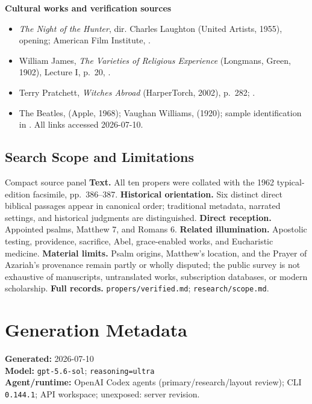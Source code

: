\begin{deepstudy}
\textbf{Cultural works and verification sources}
{\footnotesize
\begin{itemize}[itemsep=0em,topsep=0.15em,parsep=0pt]
\item \emph{The Night of the Hunter}, dir. Charles Laughton (United Artists, 1955), opening; American Film Institute, .
\item William James, \emph{The Varieties of Religious Experience} (Longmans, Green, 1902), Lecture I, p.~20, .
\item Terry Pratchett, \emph{Witches Abroad} (HarperTorch, 2002), p.~282; .
\item The Beatles,  (Apple, 1968); Vaughan Williams,  (1920); sample identification in . All links accessed 2026-07-10.
\end{itemize}
}

\subsection*{Search Scope and Limitations}

\begin{studybox}{Compact source panel}
\textbf{Text.} All ten propers were collated with the 1962 typical-edition facsimile, pp.~386--387. \textbf{Historical orientation.} Six distinct direct biblical passages appear in canonical order; traditional metadata, narrated settings, and historical judgments are distinguished. \textbf{Direct reception.} Appointed psalms, Matthew 7, and Romans 6. \textbf{Related illumination.} Apostolic testing, providence, sacrifice, Abel, grace-enabled works, and Eucharistic medicine. \textbf{Material limits.} Psalm origins, Matthew's location, and the Prayer of Azariah's provenance remain partly or wholly disputed; the public survey is not exhaustive of manuscripts, untranslated works, subscription databases, or modern scholarship. \textbf{Full records.} \nolinkurl{propers/verified.md}; \nolinkurl{research/scope.md}.
\end{studybox}

\section*{Generation Metadata}

{\footnotesize
\textbf{Generated:} 2026-07-10\\
\textbf{Model:} \texttt{gpt-5.6-sol}; \texttt{reasoning=ultra}\\
\textbf{Agent/runtime:} OpenAI Codex agents (primary/research/layout review); CLI \texttt{0.144.1}; API workspace; unexposed: server revision.\par
}

\end{deepstudy}

